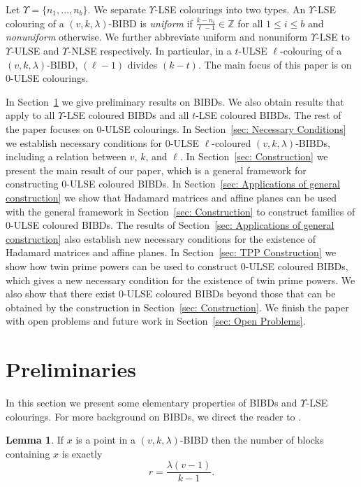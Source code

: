 \documentclass[12pt]{article}
\theoremstyle{definition}
\newtheorem{lemma}[theorem]{Lemma}
\newcommand{\deviations}{\Upsilon}
\begin{document}
Let $\deviations = \{n_1, \dots, n_b\}$. We separate $\deviations$-LSE colourings into two types. An $\deviations$-LSE colouring of a $(v,k,\lambda)$-BIBD is \emph{uniform} if $\frac{k-n_i}{\ell-1} \in \mathbb{Z}$ for all $1\leq i\leq b$ and \emph{nonuniform} otherwise. We further abbreviate uniform and nonuniform $\deviations$-LSE to $\deviations$-ULSE and $\deviations$-NLSE respectively. In particular, in a $t$-ULSE $\ell$-colouring of a $(v,k,\lambda)$-BIBD, $(\ell-1)$ divides $(k-t)$. The main focus of this paper is on $0$-ULSE colourings.

In Section~\ref{sec: Preliminaries} we give preliminary results on BIBDs. We also obtain results that apply to all $\deviations$-LSE coloured BIBDs and all $t$-LSE coloured BIBDs. The rest of the paper focuses on $0$-ULSE colourings. In Section~\ref{sec: Necessary Conditions} we establish necessary conditions for $0$-ULSE $\ell$-coloured $(v,k,\lambda)$-BIBDs, including a relation between $v$, $k$, and $\ell$. In Section~\ref{sec: Construction} we present the main result of our paper, which is a general framework for constructing $0$-ULSE coloured BIBDs. In Section~\ref{sec: Applications of general construction} we show that Hadamard matrices and affine planes can be used with the general framework in Section~\ref{sec: Construction} to construct families of $0$-ULSE coloured BIBDs. The results of Section~\ref{sec: Applications of general construction} also establish new necessary conditions for the existence of Hadamard matrices and affine planes. In Section~\ref{sec: TPP Construction} we show how twin prime powers can be used to construct $0$-ULSE coloured BIBDs, which gives a new necessary condition for the existence of twin prime powers. We also show that there exist $0$-ULSE coloured BIBDs beyond those that can be obtained by the construction in Section~\ref{sec: Construction}. We finish the paper with open problems and future work in Section~\ref{sec: Open Problems}.




\section{Preliminaries}\label{sec: Preliminaries}

In this section we present some elementary properties of BIBDs and $\deviations$-LSE colourings. For more background on BIBDs, we direct the reader to \cite{S04}.

\begin{lemma}\label{lem: replication num of a BIBD}
    If $x$ is a point in a $(v,k,\lambda)$-BIBD then the number of blocks containing $x$ is exactly $$r = \frac{\lambda(v-1)}{k-1}.$$
\end{lemma}
\end{document}
